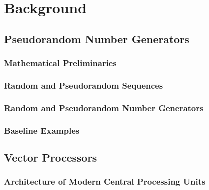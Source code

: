 \documentclass[crop=false]{standalone}
\begin{document}
  \section{Background} %
  \label{sec:background}
    \subsection{Pseudorandom Number Generators} %
    \label{sub:pseudorandom_number_generators}
      \subsubsection{Mathematical Preliminaries} %
      \label{ssub:mathematical_preliminaries}


      \subsubsection{Random and Pseudorandom Sequences} %
      \label{ssub:random_and_pseudorandom_sequences}


      \subsubsection{Random and Pseudorandom Number Generators} %
      \label{ssub:random_and_pseudorandom_number_generators}


      \subsubsection{Baseline Examples} %
      \label{ssub:baseline_examples}


    \subsection{Vector Processors} %
    \label{sub:vector_processors}
      \subsubsection{Architecture of Modern Central Processing Units} %
      \label{ssub:architecture_of_modern_central_processing_units}
\end{document}
